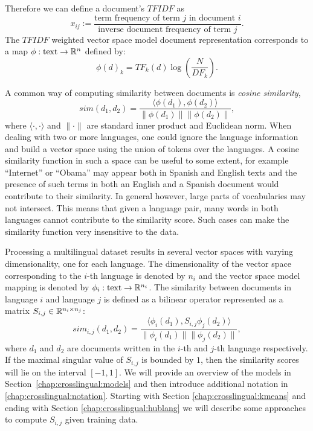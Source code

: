 Therefore we can define a document's $TFIDF$ as
$$ x_{ij}  := \frac{\mbox{term frequency of term~} j \mbox{~in document~} i}{\mbox{inverse document frequency of term~} j}.$$
The $TFIDF$ weighted vector space model document representation corresponds
to a map $\phi : \text{text} \rightarrow \mathbb{R}^n$ defined by:
$$\phi(d)_k = {TF}_k(d) \log\left( \frac{N}{{DF}_k}\right).$$

A common way of computing similarity between documents is \emph{cosine similarity},
$$sim(d_1, d_2) = \frac{\langle \phi(d_1), \phi(d_2)\rangle}{\|\phi(d_1)\| \|\phi(d_2)\|},$$
where $\langle \cdot,\cdot \rangle$ and $\|\cdot\|$ are standard inner product and
Euclidean norm. When dealing with two or more languages, one could ignore the language information
and build a vector space using the union of tokens over the languages. A cosine similarity
function in such a space can be useful to some extent, for example ``Internet'' or ``Obama''
may appear both in Spanish and English texts and the presence of such terms in both an
English and a Spanish document would contribute to their similarity. In general however,
large parts of vocabularies may not intersect. This means that given a language pair,
many words in both languages cannot contribute to the similarity score. Such cases
can make the similarity function very insensitive to the data.

Processing a multilingual dataset results in several vector spaces with varying dimensionality,
one for each language. The dimensionality of the vector space corresponding to the $i$-th
language is denoted by $n_i$ and the vector space model mapping is denoted by
$\phi_i : \text{text} \rightarrow \mathbb{R}^{n_i}$.
The similarity between documents in language $i$ and language $j$ is defined as a bilinear
operator represented as a matrix $S_{i,j} \in \mathbb{R}^{n_i \times n_j}$:
$$sim_{i,j}(d_1, d_2) = \frac{ \langle \phi_i (d_1), S_{i,j} \phi_j (d_2) \rangle }{\|\phi_i(d_1)\| \|\phi_j(d_2)\|},$$
where $d_1$ and $d_2$ are documents written in the $i$-th and $j$-th language respectively.
If the maximal singular value of $S_{i,j}$ is bounded by $1$, then the similarity scores
will lie on the interval $[-1, 1]$. We will provide an overview of the models in
Section~\ref{chap:crosslingual:models} and then introduce additional notation in \ref{chap:crosslingual:notation}.
Starting with Section \ref{chap:crosslingual:kmeans} and ending with Section \ref{chap:crosslingual:hublang} we will
describe some approaches to compute $S_{i,j}$ given training data.

